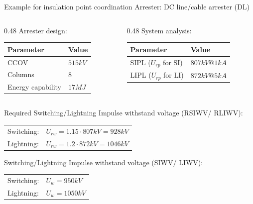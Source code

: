 \begin{frame}{Example for insulation point coordination}
  Arrester: DC line/cable arrester (DL)
  \vspace{0.5em}
  \begin{columns}[T,onlytextwidth]
    \begin{column}{0.48\textwidth}
      Arrester design:
      \newline\newline
      \begin{tabular}{@{}l l@{}}
        Parameter & Value \\
        \hline
        CCOV & $515kV$ \\
        Columns & $8$ \\
        Energy capability & $17MJ$ \\
      \end{tabular}
    \end{column}
    \begin{column}{0.48\textwidth}
      System analysis:
      \newline\newline
      \vspace{1em}
      \begin{tabular}{@{}l l@{}}
        Parameter & Value\\
        \hline
        SIPL ($U_{rp}$ for SI) & $807kV @ 1kA$ \\
        LIPL ($U_{rp}$ for LI) & $872kV @ 5kA$ \\
      \end{tabular}
    \end{column}
  \end{columns}
  \vspace{1em}
  Required Switching/Lightning Impulse withstand voltage (RSIWV/ RLIWV):\\
  \begin{tabular}{l l}
    Switching: & $U_{rw} = 1.15 \cdot 807kV = 928kV$\\
    Lightning: & $U_{rw} = 1.2 \cdot 872kV = 1046kV$\\    
  \end{tabular}
  \newline\newline
  Switching/Lightning Impulse withstand voltage (SIWV/ LIWV):\\
    \begin{tabular}{l l}
    Switching: & $U_{w} = 950kV$\\
    Lightning: & $U_{w} = 1050kV$\\    
  \end{tabular}
\end{frame}
